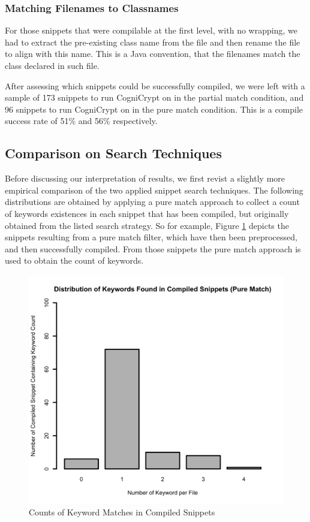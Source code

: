 \documentclass[10pt, conference]{IEEEtran}
\begin{document}
\subsubsection{Matching Filenames to Classnames}
For those snippets that were compilable at the first level, with no wrapping, we had to extract the pre-existing class name from the file and then rename the file to align with this name. This is a Java convention, that the filenames match the class declared in such file.

After assessing which snippets could be successfully compiled, we were left with a sample of 173 snippets to run CogniCrypt on in the partial match condition, and 96 snippets to run CogniCrypt on in the pure match condition. This is a compile success rate of 51\% and 56\% respectively.


\subsection{Comparison on Search Techniques}
Before discussing our interpretation of results, we first revist a slightly more empirical comparison of the two applied snippet search techniques. The following distributions are obtained by applying a pure match approach to collect a count of keywords existences in each snippet that has been compiled, but originally obtained from the listed search strategy. So for example, Figure \ref{fig:KeywordDistPureMatch} depicts the snippets resulting from a pure match filter, which have then been preprocessed, and then successfully compiled. From those snippets the pure match approach is used to obtain the count of keywords.

\begin{figure}[h]
\begin{center}
\includegraphics[width=0.9\linewidth]{CompiledKeywordDistPureMatch.png}
\caption{Counts of Keyword Matches in Compiled Snippets}
\label{fig:KeywordDistPureMatch}
\end{center}
\end{figure}
\end{document}
